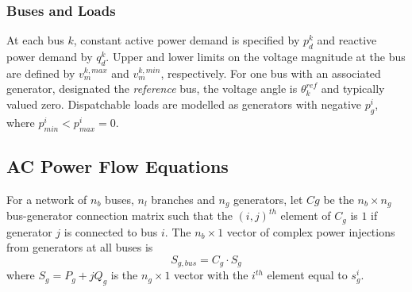 \subsubsection{Buses and Loads}
At each bus $k$, constant active power demand is specified by
$p^k_d$ and reactive power demand by $q^k_d$.  Upper and lower
limits on the voltage magnitude at the bus are defined by $v_m^{k,max}$ and
$v_m^{k,min}$, respectively.  For one bus with an associated generator,
designated the \textit{reference} bus, the voltage angle is $\theta^{ref}_k$
and typically valued zero.
Dispatchable loads are modelled as generators with negative $p^i_g$, where
$p^i_{min} < p^i_{max} = 0$. %

\subsection{AC Power Flow Equations}
\label{sec:acpf}
For a network of $n_b$ buses, $n_l$ branches and $n_g$ generators, let $Cg$ be
the $n_b \times n_g$ bus-generator connection matrix such that the $(i,j)^{th}$
element of $C_{g}$ is $1$ if generator $j$ is connected to bus $i$.  The
$n_b \times 1$ vector of complex power injections from generators at all buses
is
\begin{equation}
S_{g,bus} = C_g \cdot S_g
\end{equation}
where $S_g = P_g + jQ_g$ is the $n_g \times 1$ vector with the $i^{th}$ element
equal to $s^i_g$.

